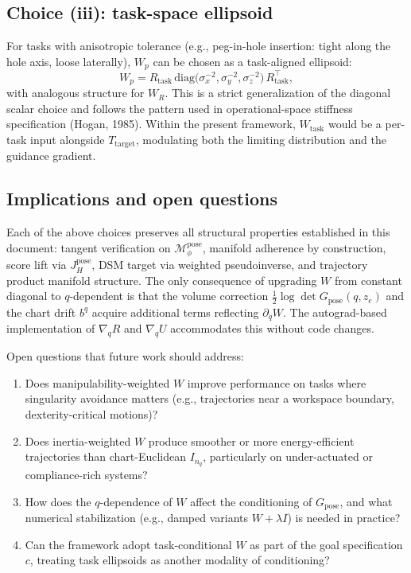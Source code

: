 \documentclass[11pt,a4paper]{article}
\newcommand{\Mpose}{\mathcal{M}_\phi^{\text{pose}}}
\begin{document}
\subsection{Choice (iii): task-space ellipsoid}

For tasks with anisotropic tolerance (e.g., peg-in-hole insertion: tight along the hole axis, loose laterally), $W_p$ can be chosen as a task-aligned ellipsoid:
\begin{equation}
W_p = R_{\text{task}} \, \mathrm{diag}\bigl( \sigma_x^{-2}, \sigma_y^{-2}, \sigma_z^{-2} \bigr) \, R_{\text{task}}^\top,
\end{equation}
with analogous structure for $W_R$. This is a strict generalization of the diagonal scalar choice and follows the pattern used in operational-space stiffness specification (Hogan, 1985). Within the present framework, $W_\text{task}$ would be a per-task input alongside $T_{\text{target}}$, modulating both the limiting distribution and the guidance gradient.

\subsection{Implications and open questions}

Each of the above choices preserves all structural properties established in this document: tangent verification on $\Mpose$, manifold adherence by construction, score lift via $J_H^{\text{pose}}$, DSM target via weighted pseudoinverse, and trajectory product manifold structure. The only consequence of upgrading $W$ from constant diagonal to $q$-dependent is that the volume correction $\tfrac{1}{2}\log\det G_{\text{pose}}(q, z_e)$ and the chart drift $b^q$ acquire additional terms reflecting $\partial_q W$. The autograd-based implementation of $\nabla_q R$ and $\nabla_q U$ accommodates this without code changes.

Open questions that future work should address:
\begin{enumerate}[leftmargin=*, noitemsep]
    \item Does manipulability-weighted $W$ improve performance on tasks where singularity avoidance matters (e.g., trajectories near a workspace boundary, dexterity-critical motions)?
    \item Does inertia-weighted $W$ produce smoother or more energy-efficient trajectories than chart-Euclidean $I_{n_q}$, particularly on under-actuated or compliance-rich systems?
    \item How does the $q$-dependence of $W$ affect the conditioning of $G_{\text{pose}}$, and what numerical stabilization (e.g., damped variants $W + \lambda I$) is needed in practice?
    \item Can the framework adopt task-conditional $W$ as part of the goal specification $c$, treating task ellipsoids as another modality of conditioning?
\end{enumerate}
\end{document}
